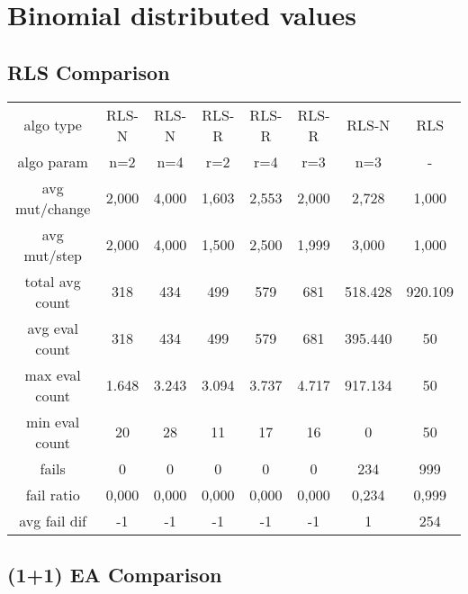 \section{Binomial distributed values}

\subsection{RLS Comparison}


\begin{tabular}[h]{cccccccc}
algo type&          RLS-N&   RLS-N&   RLS-R&   RLS-R&   RLS-R&   RLS-N&     RLS\\
algo param&           n=2&     n=4&     r=2&     r=4&     r=3&     n=3&       -\\
avg mut/change&     2,000&   4,000&   1,603&   2,553&   2,000&   2,728&   1,000\\
avg mut/step&       2,000&   4,000&   1,500&   2,500&   1,999&   3,000&   1,000\\
\hline
total avg count&      318&     434&     499&     579&     681& 518.428& 920.109\\
avg eval count&       318&     434&     499&     579&     681& 395.440&      50\\
max eval count&     1.648&   3.243&   3.094&   3.737&   4.717& 917.134&      50\\
min eval count&        20&      28&      11&      17&      16&       0&      50\\
\hline
fails&                  0&       0&       0&       0&       0&     234&     999\\
fail ratio&         0,000&   0,000&   0,000&   0,000&   0,000&   0,234&   0,999\\
avg fail dif&          -1&      -1&      -1&      -1&      -1&       1&     254\\
\end{tabular}


\subsection{(1+1) EA Comparison}


